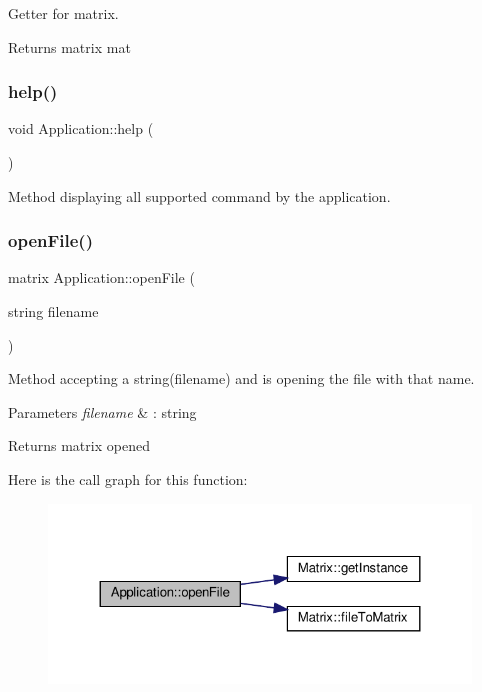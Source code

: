 Getter for matrix. \begin{DoxyReturn}{Returns}
matrix mat 
\end{DoxyReturn}
\mbox{\label{class_application_a2c6518d7f121299d9be8c66d31997fbc}} 
\subsubsection{\texorpdfstring{help()}{help()}}
{\footnotesize\ttfamily void Application\+::help (\begin{DoxyParamCaption}{ }\end{DoxyParamCaption})}

Method displaying all supported command by the application. \mbox{\label{class_application_ab2f161414a4e2f16e28321c192051006}} 
\subsubsection{\texorpdfstring{open\+File()}{openFile()}}
{\footnotesize\ttfamily matrix Application\+::open\+File (\begin{DoxyParamCaption}\item[{string}]{filename }\end{DoxyParamCaption})}

Method accepting a string(filename) and is opening the file with that name. 
\begin{DoxyParams}{Parameters}
{\em filename} & \+: string \\
\hline
\end{DoxyParams}
\begin{DoxyReturn}{Returns}
matrix opened 
\end{DoxyReturn}
Here is the call graph for this function\+:\nopagebreak
\begin{figure}[H]
\begin{center}
\leavevmode
\includegraphics[width=324pt]{class_application_ab2f161414a4e2f16e28321c192051006_cgraph}
\end{center}
\end{figure}
\mbox{\label{class_application_a533bb50380401b3a7bfaef31a9faf7f5}} 
